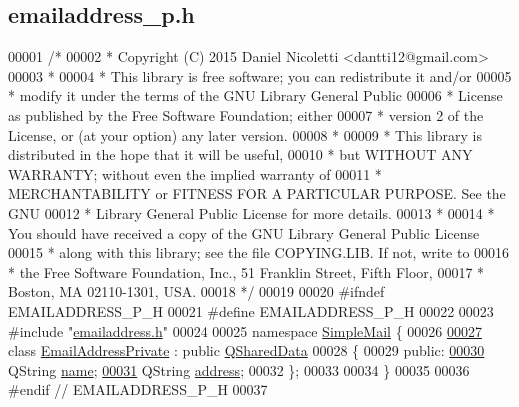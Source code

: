 \hypertarget{emailaddress__p_8h_source}{}\subsection{emailaddress\+\_\+p.\+h}
\label{emailaddress__p_8h_source}

\begin{DoxyCode}
00001 \textcolor{comment}{/*}
00002 \textcolor{comment}{ * Copyright (C) 2015 Daniel Nicoletti <dantti12@gmail.com>}
00003 \textcolor{comment}{ *}
00004 \textcolor{comment}{ * This library is free software; you can redistribute it and/or}
00005 \textcolor{comment}{ * modify it under the terms of the GNU Library General Public}
00006 \textcolor{comment}{ * License as published by the Free Software Foundation; either}
00007 \textcolor{comment}{ * version 2 of the License, or (at your option) any later version.}
00008 \textcolor{comment}{ *}
00009 \textcolor{comment}{ * This library is distributed in the hope that it will be useful,}
00010 \textcolor{comment}{ * but WITHOUT ANY WARRANTY; without even the implied warranty of}
00011 \textcolor{comment}{ *  MERCHANTABILITY or FITNESS FOR A PARTICULAR PURPOSE. See the GNU}
00012 \textcolor{comment}{ * Library General Public License for more details.}
00013 \textcolor{comment}{ *}
00014 \textcolor{comment}{ * You should have received a copy of the GNU Library General Public License}
00015 \textcolor{comment}{ * along with this library; see the file COPYING.LIB. If not, write to}
00016 \textcolor{comment}{ * the Free Software Foundation, Inc., 51 Franklin Street, Fifth Floor,}
00017 \textcolor{comment}{ * Boston, MA 02110-1301, USA.}
00018 \textcolor{comment}{ */}
00019 
00020 \textcolor{preprocessor}{#ifndef EMAILADDRESS\_P\_H}
00021 \textcolor{preprocessor}{#define EMAILADDRESS\_P\_H}
00022 
00023 \textcolor{preprocessor}{#include "\hyperlink{emailaddress_8h}{emailaddress.h}"}
00024 
00025 \textcolor{keyword}{namespace }\hyperlink{namespace_simple_mail}{SimpleMail} \{
00026 
\hyperlink{class_simple_mail_1_1_email_address_private}{00027} \textcolor{keyword}{class }\hyperlink{class_simple_mail_1_1_email_address_private}{EmailAddressPrivate} : \textcolor{keyword}{public} \hyperlink{class_q_shared_data}{QSharedData}
00028 \{
00029 \textcolor{keyword}{public}:
\hyperlink{class_simple_mail_1_1_email_address_private_ae60cdddafe1a563cff906aa5896ba3a6}{00030}     QString \hyperlink{class_simple_mail_1_1_email_address_private_ae60cdddafe1a563cff906aa5896ba3a6}{name};
\hyperlink{class_simple_mail_1_1_email_address_private_a7936750652c9a1388b9e24c3a9fce0ed}{00031}     QString \hyperlink{class_simple_mail_1_1_email_address_private_a7936750652c9a1388b9e24c3a9fce0ed}{address};
00032 \};
00033 
00034 \}
00035 
00036 \textcolor{preprocessor}{#endif // EMAILADDRESS\_P\_H}
00037 
\end{DoxyCode}
